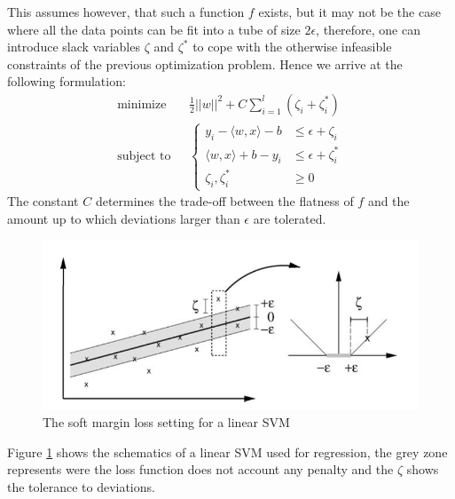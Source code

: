 This assumes however, that such a function $f$ exists, but it may not be the case where all the data points can be fit into a tube of size $2\epsilon$, therefore, one can introduce slack variables $\zeta$ and $\zeta^*$ to cope with the otherwise infeasible constraints of the previous optimization problem. Hence we arrive at the following formulation:
\begin{align}
\text{minimize} \,\,\, \, &\frac{1}{2}||w||^2 + C\sum_{i = 1}^{l} (\zeta_i + \zeta^{*}_{i}) \\
\text{subject to} \,\,\,\, &
\begin{cases}
y_i - \langle w, x \rangle  - b & \leq \epsilon + \zeta_i \\
\langle w, x \rangle  + b - y_i &\leq \epsilon + \zeta^{*}_i \\
\zeta_i, \zeta^{*}_{i} &\geq 0
\end{cases}
\end{align}
The constant $C$ determines the trade-off between the flatness of $f$ and the amount up to which deviations larger than $\epsilon$ are tolerated. 
\begin{figure}[th!]
	\centering
	\includegraphics[width=1\linewidth]{TeX_files/Imagenes/svr_graph}
	\caption{The soft margin loss setting for a linear SVM \cite{Hofmann2008}}
	\label{fig:svrgraph}
\end{figure}
Figure \ref{fig:svrgraph} shows the schematics of a linear SVM used for regression, the grey zone represents were the loss function does not account any penalty and the $\zeta$ shows the tolerance to deviations. 

